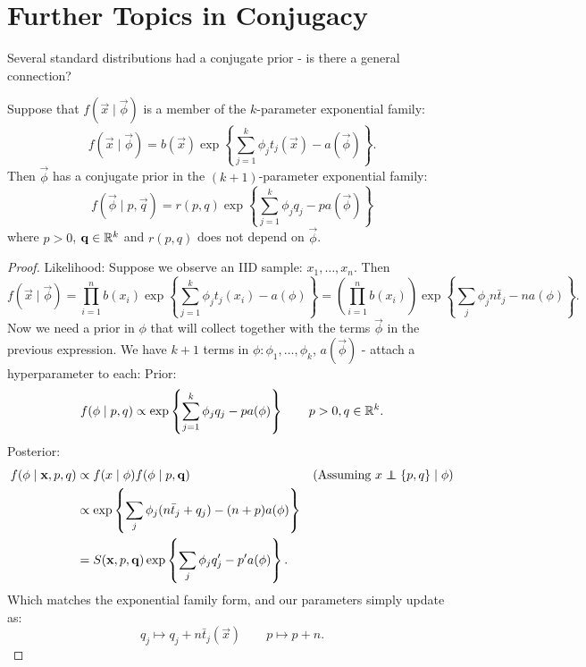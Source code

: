 \documentclass[10pt, a4paper]{article}
\begin{document}
\newpage

\section{Further Topics in Conjugacy}

Several standard distributions had a conjugate prior -
is there a general connection?

\begin{proposition}
    Suppose that $f(\vec{x}\mid \vec{\phi})$ is a member of the $k$-parameter exponential family:
    \[
    f(\vec{x} \mid \vec{\phi}) = b(\vec{x})\exp\left\{\sum_{j = 1}^{k}\phi_jt_j(\vec{x}) - a(\vec{\phi})\right\}.
    \]
    Then $\vec{\phi}$ has a conjugate prior in the $(k + 1)$-parameter exponential family:
    \[
    f(\vec{\phi} \mid p, \vec{q}) = r(p, q)\exp\left\{\sum_{j = 1}^{k}\phi_jq_j - pa(\vec{\phi})\right\}
    \]
    where $p > 0$,
    $\mathbf{q} \in \mathbb{R} ^ k$ and $r(p, q)$ does not depend on $\vec{\phi}$.

    \begin{proof}
        Likelihood:
        Suppose we observe an IID sample:
        $x_1, \dotsc, x_n$.
        Then
        \[
        f(\vec{x} \mid \vec{\phi}) = \prod_{i = 1}^{n}b(x_i)\exp\left\{\sum_{j = 1}^{k}\phi_jt_j(x_i) - a(\phi)\right\} = \left(\prod_{i = 1}^{n}b(x_i)\right)\exp\left\{\sum_{j}\phi_jn\bar{t}_j - na(\phi)\right\}.
        \]
        Now we need a prior in $\phi$ that will collect together with the terms $\vec{\phi}$ in the previous expression.
        We have $k + 1$ terms in $\phi: \phi_1, \dotsc, \phi_k$,
        $a(\vec{\phi})$ -
        attach a hyperparameter to each:
        Prior:
        \[
        f(\mathbf{\phi} \mid p, q) \propto \exp\left\{\sum_{j = 1}^{k}\phi_jq_j - pa(\mathbf{\phi})\right\}\qquad p > 0, q \in \mathbb{R} ^ k.
        \]
        Posterior:
        \begin{align*}
            f(\vec{\phi} \mid \vec{x}, p, q) &\propto f(x \mid \vec{\phi})f(\vec{\phi} \mid p, \vec{q})&&(\text{Assuming $x \independent \{p, q\} \mid \vec{\phi}$}) \\
            &\propto \exp\left\{\sum_{j}\phi_j(n\bar{t}_j + q_j) - (n + p)a(\vec{\phi})\right\} \\
            &= S(\vec{x}, p, \vec{q})\exp\left\{\sum_{j}\phi_jq_j' - p'a(\vec{\phi})\right\}.
        \end{align*}
        Which matches the exponential family form,
        and our parameters simply update as:
        \[
        q_j \mapsto q_j + n\bar{t}_j(\vec{x})\qquad p \mapsto p + n.
        \]
    \end{proof}
\end{proposition}
\end{document}
